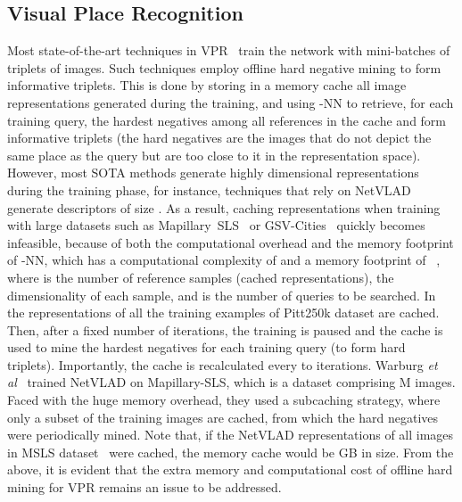 \documentclass{bmvc2k}
\def\etal{\emph{et al}\bmvaOneDot}
\begin{document}
\subsection{Visual Place Recognition}\label{ssec:vpr}
Most state-of-the-art techniques in VPR~\cite{arandjelovic2016netvlad, liu2019stochastic, seymour2019semantically, warburg2020mapillary, kim2017learned, liu2020digging, hausler2021patch, wang2022transvpr} train the network with mini-batches of triplets of images. Such techniques employ offline hard negative mining to form informative triplets. This is done by storing in a memory cache all image representations generated during the training, and using -NN to retrieve, for each training query, the hardest negatives among all references in the cache and form informative triplets (the hard negatives are the images that do not depict the same place as the query but are too close to it in the representation space). However, most SOTA methods generate highly dimensional representations during the training phase, for instance, techniques that rely on NetVLAD~\cite{arandjelovic2016netvlad} generate descriptors of size . As a result, caching representations when training with large datasets such as Mapillary~SLS~\cite{warburg2020mapillary} or GSV-Cities~\cite{ali2022gsv} quickly becomes infeasible, because of both the computational overhead and the memory footprint of -NN, which has a computational complexity of  and a memory footprint of ~\cite{cunningham2021k}, where  is the number of reference samples (cached representations),  the dimensionality of each sample, and  is the number of queries to be searched.
In \cite{thoma2020soft, arandjelovic2016netvlad, liu2019stochastic} the representations of all the training examples of Pitt250k dataset are cached. Then, after a fixed number of iterations, the training is paused and the cache is used to mine the hardest  negatives for each training query (to form hard triplets). Importantly, the cache is recalculated every  to  iterations. Warburg \etal~\cite{warburg2020mapillary} trained NetVLAD on Mapillary-SLS, which is a dataset comprising M images. Faced with the huge memory overhead, they used a subcaching strategy, where only a subset of the training images are cached, from which the hard negatives were periodically mined. Note that, if the NetVLAD representations of all images in MSLS dataset~\cite{warburg2020mapillary} were cached, the memory cache would be GB in size.
From the above, it is evident that the extra memory and computational cost of offline hard mining for VPR remains an issue to be addressed. 
\end{document}
